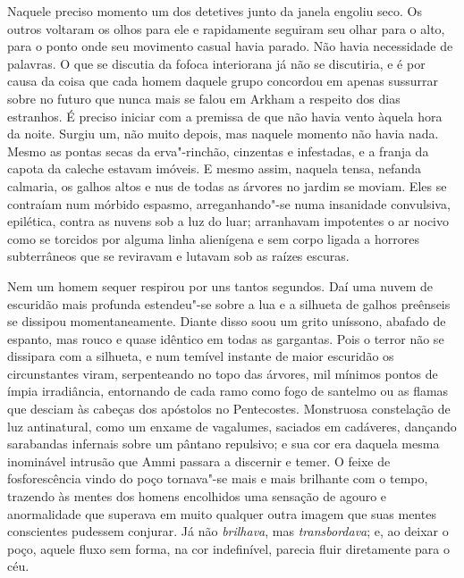 Naquele preciso momento um dos detetives junto da janela engoliu seco.
Os outros voltaram os olhos para ele e rapidamente seguiram seu olhar
para o alto, para o ponto onde seu movimento casual havia parado. Não
havia necessidade de palavras. O que se discutia da fofoca interiorana
já não se discutiria, e é por causa da coisa que cada homem daquele
grupo concordou em apenas sussurrar sobre no futuro que nunca mais se
falou em Arkham a respeito dos dias estranhos. É preciso iniciar com a
premissa de que não havia vento àquela hora da noite. Surgiu um, não
muito depois, mas naquele momento não havia nada. Mesmo as pontas secas
da erva"-rinchão, cinzentas e infestadas, e a franja da capota da caleche
estavam imóveis. E mesmo assim, naquela tensa, nefanda calmaria, os
galhos altos e nus de todas as árvores no jardim se moviam. Eles se
contraíam num mórbido espasmo, arreganhando"-se numa insanidade
convulsiva, epilética, contra as nuvens sob a luz do luar; arranhavam
impotentes o ar nocivo como se torcidos por alguma linha alienígena e
sem corpo ligada a horrores subterrâneos que se reviravam e lutavam sob
as raízes escuras.

Nem um homem sequer respirou por uns tantos segundos. Daí uma nuvem de
escuridão mais profunda estendeu"-se sobre a lua e a silhueta de galhos
preênseis se dissipou momentaneamente. Diante disso soou um grito
uníssono, abafado de espanto, mas rouco e quase idêntico em todas as
gargantas. Pois o terror não se dissipara com a silhueta, e num temível
instante de maior escuridão os circunstantes viram, serpenteando no topo
das árvores, mil mínimos pontos de ímpia irradiância, entornando de cada
ramo como fogo de santelmo ou as flamas que desciam às cabeças dos
apóstolos no Pentecostes. Monstruosa constelação de luz antinatural,
como um enxame de vagalumes, saciados em cadáveres, dançando sarabandas
infernais sobre um pântano repulsivo; e sua cor era daquela mesma
inominável intrusão que Ammi passara a discernir e temer. O feixe de
fosforescência vindo do poço tornava"-se mais e mais brilhante com o
tempo, trazendo às mentes dos homens encolhidos uma sensação de agouro e
anormalidade que superava em muito qualquer outra imagem que suas mentes
conscientes pudessem conjurar. Já não \textit{brilhava}, mas
\textit{transbordava}; e, ao deixar o poço, aquele fluxo sem forma, na cor
indefinível, parecia fluir diretamente para o céu.

